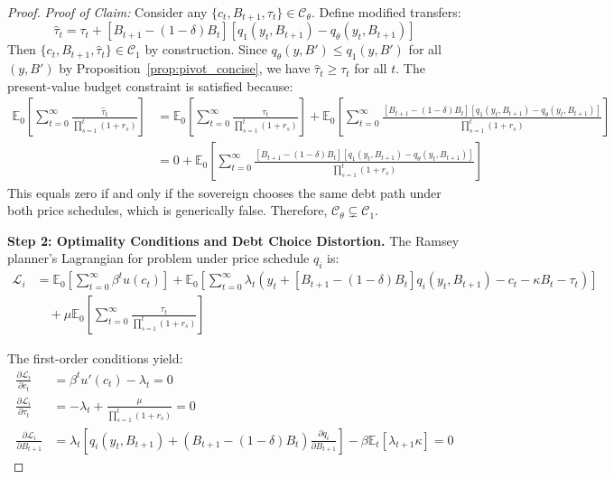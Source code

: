 \documentclass[12pt]{article}
\theoremstyle{plain}
\begin{document}
\begin{proof}
	\textit{Proof of Claim:} Consider any $\{c_t, B_{t+1}, \tau_t\} \in \mathcal{C}_\theta$. Define modified transfers:
	\begin{equation}
		\hat{\tau}_t = \tau_t + [B_{t+1} - (1-\delta)B_t][q_1(y_t, B_{t+1}) - q_\theta(y_t, B_{t+1})] \label{eq:modified_transfers}
	\end{equation}
	Then $\{c_t, B_{t+1}, \hat{\tau}_t\} \in \mathcal{C}_1$ by construction. Since $q_\theta(y, B') \leq q_1(y, B')$ for all $(y, B')$ by Proposition~\ref{prop:pivot_concise}, we have $\hat{\tau}_t \geq \tau_t$ for all $t$. The present-value budget constraint is satisfied because:
	\begin{align}
		\mathbb{E}_0 \left[ \sum_{t=0}^\infty \frac{\hat{\tau}_t}{\prod_{s=1}^t (1+r_s)} \right] & = \mathbb{E}_0 \left[ \sum_{t=0}^\infty \frac{\tau_t}{\prod_{s=1}^t (1+r_s)} \right] + \mathbb{E}_0 \left[ \sum_{t=0}^\infty \frac{[B_{t+1} - (1-\delta)B_t][q_1(y_t, B_{t+1}) - q_\theta(y_t, B_{t+1})]}{\prod_{s=1}^t (1+r_s)} \right] \nonumber \\
		                                                                                         & = 0 + \mathbb{E}_0 \left[ \sum_{t=0}^\infty \frac{[B_{t+1} - (1-\delta)B_t][q_1(y_t, B_{t+1}) - q_\theta(y_t, B_{t+1})]}{\prod_{s=1}^t (1+r_s)} \right] \label{eq:budget_constraint_check}
	\end{align}
	This equals zero if and only if the sovereign chooses the same debt path under both price schedules, which is generically false. Therefore, $\mathcal{C}_\theta \subsetneq \mathcal{C}_1$.

	\textbf{Step 2: Optimality Conditions and Debt Choice Distortion.} The Ramsey planner's Lagrangian for problem under price schedule $q_i$ is:
	\begin{align}
		\mathcal{L}_i & = \mathbb{E}_0 \left[ \sum_{t=0}^\infty \beta^t u(c_t) \right] + \mathbb{E}_0 \left[ \sum_{t=0}^\infty \lambda_t \left( y_t + [B_{t+1} - (1-\delta)B_t]q_i(y_t, B_{t+1}) - c_t - \kappa B_t - \tau_t \right) \right] \nonumber \\
		              & \quad + \mu \mathbb{E}_0 \left[ \sum_{t=0}^\infty \frac{\tau_t}{\prod_{s=1}^t (1+r_s)} \right] \label{eq:lagrangian}
	\end{align}

	The first-order conditions yield:
	\begin{align}
		\frac{\partial \mathcal{L}_i}{\partial c_t}     & = \beta^t u'(c_t) - \lambda_t = 0 \label{eq:foc_consumption}                                                                                                                      \\
		\frac{\partial \mathcal{L}_i}{\partial \tau_t}  & = -\lambda_t + \frac{\mu}{\prod_{s=1}^t (1+r_s)} = 0 \label{eq:foc_transfers}                                                                                                     \\
		\frac{\partial \mathcal{L}_i}{\partial B_{t+1}} & = \lambda_t \left[ q_i(y_t, B_{t+1}) + (B_{t+1} - (1-\delta)B_t) \frac{\partial q_i}{\partial B_{t+1}} \right] - \beta \mathbb{E}_t[\lambda_{t+1} \kappa] = 0 \label{eq:foc_debt}
	\end{align}


\end{proof}
\end{document}
